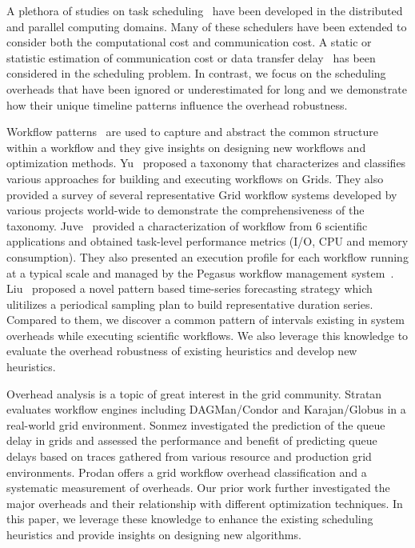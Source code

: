\documentclass[final,5p,times,twocolumn]{elsarticle}
\begin{document}
A plethora of studies on task scheduling~\cite{Chetto1990, Dong2010, Yang03, Blythe2005} have been developed in the distributed and parallel computing domains. Many of these schedulers have been extended to consider both the computational cost and communication cost. A static or statistic estimation of communication cost or data transfer delay~\cite{Dong2010, Yang03} has been considered in the scheduling problem. In contrast, we focus on the scheduling overheads that have been ignored or underestimated for long and we demonstrate how their unique timeline patterns influence the overhead robustness. 

Workflow patterns~\cite{Yu2005, Juve2013, Liu2008} are used to capture and abstract the common structure within a workflow and they give insights on designing new workflows and optimization methods.  
Yu~\cite{Yu2005} proposed a taxonomy that characterizes and classifies various approaches for building and executing workflows on Grids. They also provided a survey of several representative Grid workflow systems developed by various projects world-wide to demonstrate the comprehensiveness of the taxonomy. Juve~\cite{Juve2013} provided a characterization of workflow from 6 scientific applications and obtained task-level performance metrics (I/O, CPU and memory consumption). They also presented an execution profile for each workflow running at a typical scale and managed by the Pegasus workflow management system~\cite{Deelman2005}. Liu~\cite{Liu2008} proposed a novel pattern 
based time-series forecasting strategy which ulitilizes a 
periodical sampling plan to build representative 
duration series. Compared to them, we discover a common pattern of intervals existing in system overheads while executing scientific workflows. We also leverage this knowledge to evaluate the overhead robustness of existing heuristics and develop new heuristics. 

Overhead analysis \cite{Prodan2008b}\cite{Chen} is a topic of great interest in the grid community. Stratan \cite{Stratan} evaluates workflow engines including DAGMan/Condor and Karajan/Globus in a real-world grid environment. Sonmez \cite{Sonmez} investigated the prediction of the queue delay in grids and assessed the performance and benefit of predicting queue delays based on traces gathered from various resource and production grid environments. Prodan \cite{Prodan2008b} offers a grid workflow overhead classification and a systematic measurement of overheads. Our prior work \cite{Chen} further investigated the major overheads and their relationship with different optimization techniques. In this paper, we leverage these knowledge to enhance the existing scheduling heuristics and provide insights on designing new algorithms. 
\end{document}
